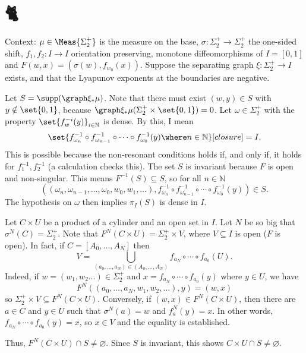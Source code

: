 \documentclass[main]{subfiles}
\begin{document}
\newcommand{\Oss}{\Sigma_2^+}

\chapter*{\fontsize{50}{60} 🐈}

Context: \(\mu \in \Meas{\Oss}\) is the measure on the base, \(\sigma \colon \Oss \to \Oss\) the one-sided shift, \(f_1,f_2 \colon I \to I\) orientation preserving, monotone diffeomorphisms of \(I = [0,1]\) and \(F(w,x) = (\sigma(w),f_{w_0}(x))\). Suppose the separating graph \(\xi \colon \Oss \to I\) exists, and that the Lyapunov exponents at the boundaries are negative.

Let \(S = \supp (\graph\xi_* \mu)\). Note that there must exist \((w,y) \in S\) with \(y \notin \set{0,1}\), because \(\graph\xi_*\mu(\Oss \times \set{0,1}) = 0\). Let \(\omega \in \Oss\) with the property \(\set{f_w^{-i}(y)}_{i \in \mathbb{N}}\) is dense. By this, I mean
\begin{equation*}
  \set{ f_{\omega_n}^{-1} \circ f_{\omega_{n - 1}}^{-1} \circ \cdots \circ f_{\omega_0}^{-1}(y) \where n \in \mathbb{N} }[closure] = I.
\end{equation*}
This is possible because the non-resonant conditions holds if, and only if, it holds for \(f_1^{-1}, f_2^{-1}\) (a calculation checks this). The set \(S\) is invariant because \(F\) is open and non-singular. This means \(F^{-1}(S) \subseteq S\), so for all \(n \in \mathbb{N}\)
\begin{equation*}
  ((\omega_n, \omega_{n - 1},\dots,\omega_0, w_0, w_1,\dots), f_{\omega_n}^{-1} \circ f_{\omega_{n - 1}}^{-1} \circ \cdots \circ f_{\omega_0}^{-1}(y)) \in S.
\end{equation*}
The hypothesis on \(\omega\) then implies \(\pi_I(S)\) is dense in \(I\).

Let \(C \times U\) be a product of a cylinder and an open set in \(I\). Let \(N\) be so big that \(\sigma^N(C) = \Oss\). Note  that \(F^N(C \times U) = \Oss \times V\), where \(V \subseteq I\) is open (\(F\) is open). In fact, if \(C = [A_0, \dots, A_N]\) then
\begin{equation*}
  V = \bigcup_{(a_0,\dots,a_N) \in (A_0, \dots, A_N)} f_{a_N} \circ \cdots \circ f_{a_0}(U).
\end{equation*}
Indeed, if \(w = (w_1,w_2\dots) \in \Oss\) and \(x = f_{a_N} \circ \cdots \circ f_{a_0}(y)\) where \(y \in U\), we have \[F^N((a_0,\dots,a_N,w_1,w_2,\dots),y) = (w,x)\]
so \(\Oss \times V \subseteq F^N(C \times U)\). Conversely, if \((w,x) \in F^N(C \times U)\), then there are \(a \in C\) and \(y \in U\) such that \(\sigma^N(a) = w\) and \(f_a^N(y) = x\). In other words, \(f_{a_N} \circ \cdots \circ f_{a_0}(y) = x\), so \(x \in V\) and the equality is established.

Thus, \(F^N(C \times U) \cap S \neq \varnothing\). Since \(S\) is invariant, this shows \(C \times U \cap S \neq \varnothing\).
\end{document}
